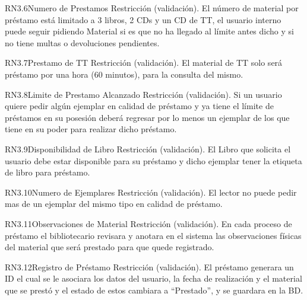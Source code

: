 \begin{BussinesRule}{RN3.6}{Numero de Prestamos} 
	\BRitem[Tipo:] Restricción (validación).
	\BRitem[Descripción:]El número de material por préstamo está limitado a 3 libros, 2 CDs y un CD de TT, el usuario interno puede seguir pidiendo Material si es que no ha llegado al límite antes dicho y si no tiene multas o devoluciones pendientes.
\end{BussinesRule}

\begin{BussinesRule}{RN3.7}{Prestamo de TT} 
	\BRitem[Tipo:] Restricción (validación).
	\BRitem[Descripción:]El material de TT solo será préstamo por una hora (60 minutos), para la consulta del mismo.
\end{BussinesRule}

\begin{BussinesRule}{RN3.8}{Limite de Prestamo Alcanzado} 
	\BRitem[Tipo:] Restricción (validación).
	\BRitem[Descripción:]Si un usuario quiere pedir algún ejemplar en calidad de préstamo y ya tiene el límite de préstamos en su posesión deberá regresar por lo menos un ejemplar de los que tiene en su poder para realizar dicho préstamo.
\end{BussinesRule}

\begin{BussinesRule}{RN3.9}{Disponibilidad de Libro } 
	\BRitem[Tipo:] Restricción (validación).
	\BRitem[Descripción:]El Libro que solicita el usuario debe estar disponible para su préstamo y dicho ejemplar tener la etiqueta de libro para préstamo.
\end{BussinesRule}

\begin{BussinesRule}{RN3.10}{Numero de Ejemplares} 
	\BRitem[Tipo:] Restricción (validación).
	\BRitem[Descripción:]El lector no puede pedir mas de un ejemplar del mismo tipo en calidad de préstamo.
\end{BussinesRule}

\begin{BussinesRule}{RN3.11}{Observaciones de Material} 
	\BRitem[Tipo:] Restricción (validación).
	\BRitem[Descripción:]En cada proceso de préstamo el bibliotecario revisara y anotara en el sistema las observaciones físicas del material que será prestado para que quede registrado.
\end{BussinesRule}

\begin{BussinesRule}{RN3.12}{Registro de Préstamo} 
	\BRitem[Tipo:] Restricción (validación).
	\BRitem[Descripción:]El préstamo generara un ID el cual se le asociara los datos del usuario, la fecha de realización y el material que se prestó y el estado de estos cambiara a “Prestado”, y se guardara en la BD.
\end{BussinesRule}

